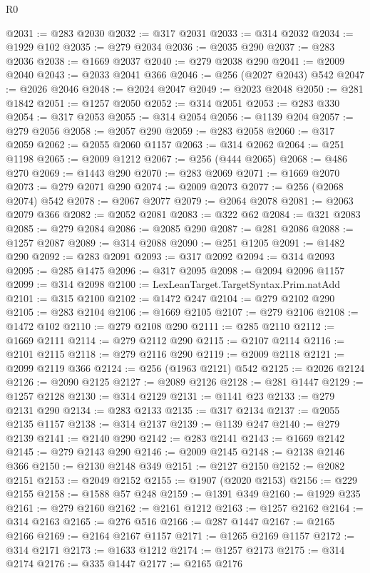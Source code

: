 \begin{lexlean}{R0}
\begin{coremodule}
@2031 := @283 @2030
@2032 := @317 @2031
@2033 := @314 @2032
@2034 := @1929 @102
@2035 := @279 @2034
@2036 := @2035 @290
@2037 := @283 @2036
@2038 := @1669 @2037
@2040 := @279 @2038 @290
@2041 := @2009 @2040
@2043 := @2033 @2041 @366
@2046 := @256 (@2027 @2043) @542
@2047 := @2026 @2046
@2048 := @2024 @2047
@2049 := @2023 @2048
@2050 := @281 @1842
@2051 := @1257 @2050
@2052 := @314 @2051
@2053 := @283 @330
@2054 := @317 @2053
@2055 := @314 @2054
@2056 := @1139 @204
@2057 := @279 @2056
@2058 := @2057 @290
@2059 := @283 @2058
@2060 := @317 @2059
@2062 := @2055 @2060 @1157
@2063 := @314 @2062
@2064 := @251 @1198
@2065 := @2009 @1212
@2067 := @256 (@444 @2065)
@2068 := @486 @270
@2069 := @1443 @290
@2070 := @283 @2069
@2071 := @1669 @2070
@2073 := @279 @2071 @290
@2074 := @2009 @2073
@2077 := @256 (@2068 @2074) @542
@2078 := @2067 @2077
@2079 := @2064 @2078
@2081 := @2063 @2079 @366
@2082 := @2052 @2081
@2083 := @322 @62
@2084 := @321 @2083
@2085 := @279 @2084
@2086 := @2085 @290
@2087 := @281 @2086
@2088 := @1257 @2087
@2089 := @314 @2088
@2090 := @251 @1205
@2091 := @1482 @290
@2092 := @283 @2091
@2093 := @317 @2092
@2094 := @314 @2093
@2095 := @285 @1475
@2096 := @317 @2095
@2098 := @2094 @2096 @1157
@2099 := @314 @2098
@2100 := LexLeanTarget.TargetSyntax.Prim.natAdd
@2101 := @315 @2100
@2102 := @1472 @247
@2104 := @279 @2102 @290
@2105 := @283 @2104
@2106 := @1669 @2105
@2107 := @279 @2106
@2108 := @1472 @102
@2110 := @279 @2108 @290
@2111 := @285 @2110
@2112 := @1669 @2111
@2114 := @279 @2112 @290
@2115 := @2107 @2114
@2116 := @2101 @2115
@2118 := @279 @2116 @290
@2119 := @2009 @2118
@2121 := @2099 @2119 @366
@2124 := @256 (@1963 @2121) @542
@2125 := @2026 @2124
@2126 := @2090 @2125
@2127 := @2089 @2126
@2128 := @281 @1447
@2129 := @1257 @2128
@2130 := @314 @2129
@2131 := @1141 @23
@2133 := @279 @2131 @290
@2134 := @283 @2133
@2135 := @317 @2134
@2137 := @2055 @2135 @1157
@2138 := @314 @2137
@2139 := @1139 @247
@2140 := @279 @2139
@2141 := @2140 @290
@2142 := @283 @2141
@2143 := @1669 @2142
@2145 := @279 @2143 @290
@2146 := @2009 @2145
@2148 := @2138 @2146 @366
@2150 := @2130 @2148 @349
@2151 := @2127 @2150
@2152 := @2082 @2151
@2153 := @2049 @2152
@2155 := @1907 (@2020 @2153)
@2156 := @229 @2155
@2158 := @1588 @57 @248
@2159 := @1391 @349
@2160 := @1929 @235
@2161 := @279 @2160
@2162 := @2161 @1212
@2163 := @1257 @2162
@2164 := @314 @2163
@2165 := @276 @516
@2166 := @287 @1447
@2167 := @2165 @2166
@2169 := @2164 @2167 @1157
@2171 := @1265 @2169 @1157
@2172 := @314 @2171
@2173 := @1633 @1212
@2174 := @1257 @2173
@2175 := @314 @2174
@2176 := @335 @1447
@2177 := @2165 @2176

\end{coremodule}
\end{lexlean}

